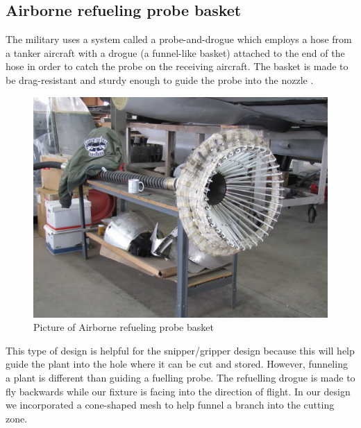\documentclass{wrcecapstone}
\begin{document}
\subsection{Airborne refueling probe basket}
The military uses a system called a probe-and-drogue which employs a hose from a tanker aircraft with a drogue (a funnel-like basket) attached to the end of the hose in order to catch the probe on the receiving aircraft.  The basket is made to be drag-resistant and sturdy enough to guide the probe into the nozzle \cite{ren2019reliable}.    
\begin{figure}
\caption{Picture of Airborne refueling probe basket \cite{ren2019reliable}}
\label{fig:3.3}
\begin{center}
\includegraphics[width=0.8\columnwidth]{figures/fig33-refueling.png}
\end{center}
\end{figure}

This type of design is helpful for the snipper/gripper design because this will help guide the plant into the hole where it can be cut and stored.  However, funneling a plant is different than guiding a fuelling probe.  The refuelling drogue is made to fly backwards while our fixture is facing into the direction of flight.  In our design we incorporated a cone-shaped mesh to help funnel a branch into the cutting zone.
\end{document}
